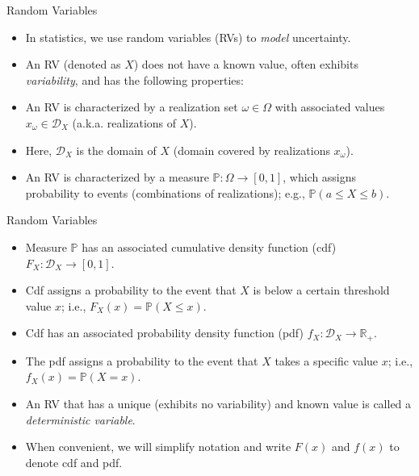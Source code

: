 \documentclass[handout,9pt]{beamer}
\begin{document}
\begin{frame}{Random Variables}
\begin{itemize}
 \setlength{\itemsep}{5pt}
\item In statistics, we use random variables (RVs) to {\em model} uncertainty. 

\item An RV (denoted as $X$) does not have a known value, often exhibits {\em variability}, and has the following properties: 
\end{itemize}
\begin{block}{}
\begin{itemize}
 \setlength{\itemsep}{10pt}
\item An RV is characterized by a realization set $\omega \in \Omega$ with associated values $x_\omega\in \mathcal{D}_X$ (a.k.a. realizations of $X$).  

\item Here, $\mathcal{D}_X$ is the domain of $X$ (domain covered by realizations $x_\omega$).

\item An RV is characterized by a measure $\mathbb{P}:\Omega\to [0,1]$, which assigns probability to events (combinations of realizations); e.g., $\mathbb{P}(a\leq X\leq b)$.
\end{itemize}
\end{block}
\end{frame}

\begin{frame}{Random Variables}
\begin{block}{}
\begin{itemize}
 \setlength{\itemsep}{10pt}
\item Measure $\mathbb{P}$ has an associated cumulative density function (cdf) $F_X:\mathcal{D}_X\to [0,1]$. 

\item Cdf assigns a probability to the event that $X$ is below a certain threshold value $x$; i.e., $F_X(x)=\mathbb{P}(X\leq x)$.
\item Cdf has an associated probability density function (pdf) $f_X:\mathcal{D}_X\to \mathbb{R}_+$. 

\item The pdf assigns a probability to the event that $X$ takes a specific value $x$; i.e., $f_X(x)=\mathbb{P}(X=x)$.  
\end{itemize}
\end{block}
\begin{itemize}
\item An RV that has a unique (exhibits no variability) and known value is called a {\em deterministic variable}. 
\item When convenient, we will simplify notation and write $F(x)$ and $f(x)$ to denote cdf and pdf. 
\end{itemize}
\end{frame}
\end{document}
